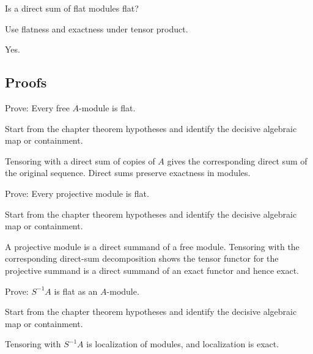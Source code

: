 \begin{exercise}\label{exr:v14-expand-05}
Is a direct sum of flat modules flat?
\end{exercise}
\begin{hint}
Use flatness and exactness under tensor product.
\end{hint}
\begin{solution}
Yes.
\end{solution}

\subsection*{Proofs}

\begin{exercise}\label{exr:v14-expand-06}
Prove: Every free $A$-module is flat.
\end{exercise}
\begin{hint}
Start from the chapter theorem hypotheses and identify the decisive algebraic map or containment.
\end{hint}
\begin{solution}
Tensoring with a direct sum of copies of $A$ gives the corresponding direct sum of the original sequence. Direct sums preserve exactness in modules.
\end{solution}

\begin{exercise}\label{exr:v14-expand-07}
Prove: Every projective module is flat.
\end{exercise}
\begin{hint}
Start from the chapter theorem hypotheses and identify the decisive algebraic map or containment.
\end{hint}
\begin{solution}
A projective module is a direct summand of a free module. Tensoring with the corresponding direct-sum decomposition shows the tensor functor for the projective summand is a direct summand of an exact functor and hence exact.
\end{solution}

\begin{exercise}\label{exr:v14-expand-08}
Prove: $S^{-1}A$ is flat as an $A$-module.
\end{exercise}
\begin{hint}
Start from the chapter theorem hypotheses and identify the decisive algebraic map or containment.
\end{hint}
\begin{solution}
Tensoring with $S^{-1}A$ is localization of modules, and localization is exact.
\end{solution}

